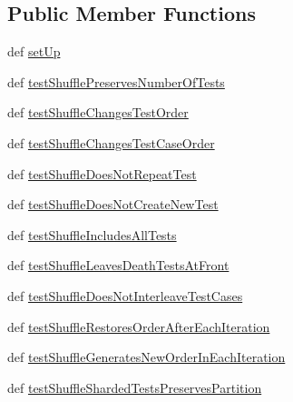 \subsection*{Public Member Functions}
\begin{DoxyCompactItemize}
\item 
def \hyperlink{classgtest__shuffle__test_1_1_g_test_shuffle_unit_test_aa728f43b26e9216937558e32ecf1afb2}{set\-Up}
\item 
def \hyperlink{classgtest__shuffle__test_1_1_g_test_shuffle_unit_test_a1e18d753b785e7543d1d1b2989257af6}{test\-Shuffle\-Preserves\-Number\-Of\-Tests}
\item 
def \hyperlink{classgtest__shuffle__test_1_1_g_test_shuffle_unit_test_a9c2ba1de84eaa4051efc5dfd4edb11ab}{test\-Shuffle\-Changes\-Test\-Order}
\item 
def \hyperlink{classgtest__shuffle__test_1_1_g_test_shuffle_unit_test_a5dbb57a67c9af313c2f8ff1ffbd5aea0}{test\-Shuffle\-Changes\-Test\-Case\-Order}
\item 
def \hyperlink{classgtest__shuffle__test_1_1_g_test_shuffle_unit_test_aa17fa03541ae75fff45bed41c4d6210c}{test\-Shuffle\-Does\-Not\-Repeat\-Test}
\item 
def \hyperlink{classgtest__shuffle__test_1_1_g_test_shuffle_unit_test_ad24ee8dadd91bbadcbf722b815641e10}{test\-Shuffle\-Does\-Not\-Create\-New\-Test}
\item 
def \hyperlink{classgtest__shuffle__test_1_1_g_test_shuffle_unit_test_a5d4d753b24a6ce2fc49e9d2916606838}{test\-Shuffle\-Includes\-All\-Tests}
\item 
def \hyperlink{classgtest__shuffle__test_1_1_g_test_shuffle_unit_test_a4378f618d0588e5b63f6a42a94b852ca}{test\-Shuffle\-Leaves\-Death\-Tests\-At\-Front}
\item 
def \hyperlink{classgtest__shuffle__test_1_1_g_test_shuffle_unit_test_abb5e2178f1c58583556cb9f0f6635e2d}{test\-Shuffle\-Does\-Not\-Interleave\-Test\-Cases}
\item 
def \hyperlink{classgtest__shuffle__test_1_1_g_test_shuffle_unit_test_a5d06f6246b468aaa61914f95bbd7d4c6}{test\-Shuffle\-Restores\-Order\-After\-Each\-Iteration}
\item 
def \hyperlink{classgtest__shuffle__test_1_1_g_test_shuffle_unit_test_ab748bd2af7c522d5b3c98c87a9b06867}{test\-Shuffle\-Generates\-New\-Order\-In\-Each\-Iteration}
\item 
def \hyperlink{classgtest__shuffle__test_1_1_g_test_shuffle_unit_test_adf50820482d82bd04fcffd0f6be149cd}{test\-Shuffle\-Sharded\-Tests\-Preserves\-Partition}
\end{DoxyCompactItemize}


